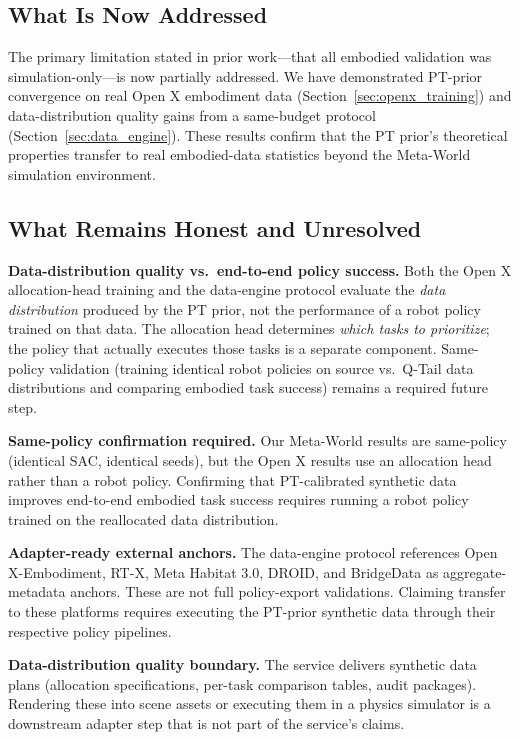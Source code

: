 \documentclass[10pt]{article}
\begin{document}
\subsection{What Is Now Addressed}
The primary limitation stated in prior work---that all embodied validation was
simulation-only---is now partially addressed.  We have demonstrated PT-prior
convergence on real Open X embodiment data (Section~\ref{sec:openx_training}) and
data-distribution quality gains from a same-budget protocol (Section~\ref{sec:data_engine}).
These results confirm that the PT prior's theoretical properties transfer to real
embodied-data statistics beyond the Meta-World simulation environment.

\subsection{What Remains Honest and Unresolved}

\textbf{Data-distribution quality vs.\ end-to-end policy success.}
Both the Open X allocation-head training and the data-engine protocol evaluate
the \emph{data distribution} produced by the PT prior, not the performance of a robot
policy trained on that data.  The allocation head determines \emph{which tasks to
prioritize}; the policy that actually executes those tasks is a separate component.
Same-policy validation (training identical robot policies on source vs.\ Q-Tail data
distributions and comparing embodied task success) remains a required future step.

\textbf{Same-policy confirmation required.}
Our Meta-World results are same-policy (identical SAC, identical seeds), but the
Open X results use an allocation head rather than a robot policy.  Confirming that
PT-calibrated synthetic data improves end-to-end embodied task success requires
running a robot policy trained on the reallocated data distribution.

\textbf{Adapter-ready external anchors.}
The data-engine protocol references Open X-Embodiment, RT-X, Meta Habitat 3.0, DROID,
and BridgeData as aggregate-metadata anchors.  These are not full policy-export
validations.  Claiming transfer to these platforms requires executing the PT-prior
synthetic data through their respective policy pipelines.

\textbf{Data-distribution quality boundary.}
The service delivers synthetic data plans (allocation specifications, per-task
comparison tables, audit packages).  Rendering these into scene assets or executing
them in a physics simulator is a downstream adapter step that is not part of the
service's claims.
\end{document}
